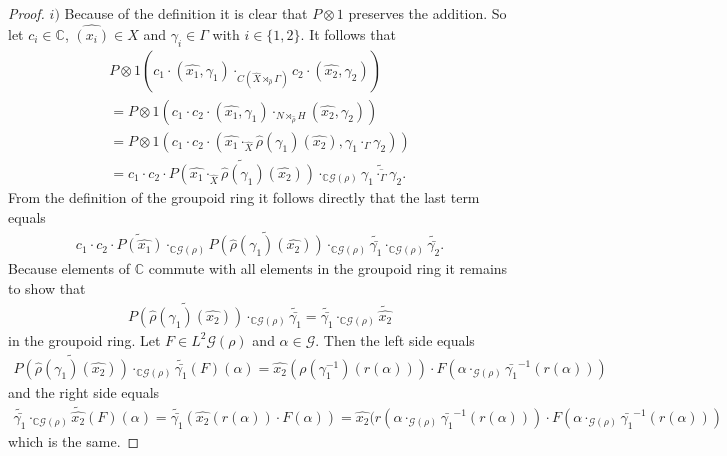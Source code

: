 \documentclass[12pt,a4paper]{scrartcl}
\numberwithin{equation}{section}
\newcommand{\C}{\mathbb{C}} %
\newcommand{\2}{\mathbb{Z} / 2 \mathbb{Z}}
\newcommand{\G}{\mathcal{G}}
\newcommand{\1}{\bar{1}}
\newcommand{\0}{\bar{0}}
\begin{document}
\begin{proof}
	$i)$ Because of the definition it is clear that $P \otimes 1$ preserves the addition. So let $c_i \in \C$, $\hat{(x_i)} \in \hat{X}$ and $\gamma_i \in \Gamma$ with $i \in \{1,2\}$. It follows that
	\begin{align*}
		P \otimes 1(c_1 \cdot (\hat{x_1}, \gamma_1) \cdot_{C(\hat{X} \rtimes_{\hat{\rho}} \Gamma)} c_2 \cdot (\hat{x_2}, \gamma_2))  \\
		= P \otimes 1(c_1 \cdot  c_2 \cdot (\hat{x_1}, \gamma_1) \cdot_{N \rtimes_{\hat{\rho}} H} (\hat{x_2}, \gamma_2)) \\
		=  P \otimes 1(c_1 \cdot  c_2 \cdot (\hat{x_1} \cdot_{\hat{X}} \hat{\rho}(\gamma_1)(\hat{x_2}), \gamma_1 \cdot_{\Gamma} \gamma_2)) \\
		= c_1 \cdot  c_2 \cdot \widetilde{P(\hat{x_1} \cdot_{\hat{X}} \hat{\rho}(\gamma_1)(\hat{x_2}))} \cdot_{\C\G(\rho)} \widetilde{\overline{\gamma_1 \cdot_{\Gamma} \gamma_2}}.
	\end{align*}
	From the definition of the groupoid ring it follows directly that the last term equals 
	\begin{align*}
		c_1 \cdot  c_2 \cdot \widetilde{P(\hat{x_1})} \cdot_{\C\G(\rho)} \widetilde{P(\hat{\rho}(\gamma_1)(\hat{x_2}))} \cdot_{\C\G(\rho)} \widetilde{\bar{\gamma_1}} \cdot_{\C\G(\rho)} \widetilde{\bar{\gamma_2}}.
	\end{align*}
	Because elements of $\C$ commute with all elements in the groupoid ring it remains to show that 
	\begin{align*}
		\widetilde{P(\hat{\rho}(\gamma_1)(\hat{x_2}))} \cdot_{\C\G(\rho)} \widetilde{\bar{\gamma_1}} = \widetilde{\bar{\gamma_1}} \cdot_{\C\G(\rho)} \tilde{\hat{x_2}} 
	\end{align*}
	in the groupoid ring.
	Let $F \in L^2 \G(\rho)$ and $\alpha \in \G$. Then the left side equals
	\begin{align*}
		\widetilde{P(\hat{\rho}(\gamma_1)(\hat{x_2}))} \cdot_{\C\G(\rho)} \widetilde{\bar{\gamma_1}}(F)(\alpha) = \hat{x_2}(\rho (\gamma_1^{-1})( r(\alpha))) \cdot F(\alpha \cdot_{\G (\rho)} \bar{\gamma_1}^{-1}(r(\alpha)))  
	\end{align*}
	and the right side equals
	\begin{align*}
		\widetilde{\bar{\gamma_1}} \cdot_{\C\G(\rho)} \tilde{\hat{x_2}}(F)(\alpha) = \widetilde{\bar{\gamma_1}}(\hat{x_2}(r(\alpha)) \cdot F(\alpha)) = \hat{x_2}(r(\alpha \cdot_{\G (\rho)} \bar{\gamma_1}^{-1}(r(\alpha))) \cdot F(\alpha \cdot_{\G (\rho)} \bar{\gamma_1}^{-1}(r(\alpha)))
	\end{align*}
	which is the same.
	

\end{proof}
\end{document}

